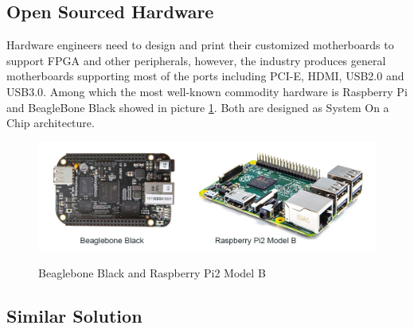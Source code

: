 \documentclass[11pt,openright,a4paper]{report}
\begin{document}
\subsection{Open Sourced Hardware}
Hardware engineers need to design and print their customized motherboards to support FPGA and other peripherals, however, the industry produces general motherboards supporting most of the ports including PCI-E, HDMI, USB2.0 and USB3.0. Among which the most well-known commodity hardware is Raspberry Pi and BeagleBone Black showed in picture \ref{fig:commodityhardware}. Both are designed as System On a Chip architecture.\\ 
\begin{figure}[H]
\centering
\includegraphics[width=0.7\linewidth]{picture/commodityhardware.jpg}
\caption{Beaglebone Black and Raspberry Pi2 Model B}\cite{bbbrpi}
\label{fig:commodityhardware}
\end{figure}

\subsection{Similar Solution}
\end{document}
